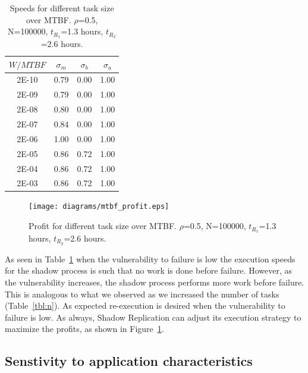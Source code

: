 \begin{table}[!h]\small
	\caption{Speeds for different task size over MTBF. $\rho$=0.5, N=100000, $t_{R_1}$=1.3 hours, $t_{R_2}$=2.6 hours.}
	\centering
		\begin{tabular}{|c|c|c|c|}
		\hline
		$W/MTBF$ & $\sigma_m$ & $\sigma_b$ & $\sigma_a$ \\
		\hline
		2E-10	&	0.79 &	0.00 &	1.00 \\
		\hline
		2E-09	&	0.79 &	0.00 &	1.00 \\
		\hline
		2E-08	&	0.80 &	0.00 &	1.00 \\
		\hline
		2E-07	&	0.84 &	0.00 &	1.00 \\
		\hline
		2E-06	&	1.00 &	0.00 &	1.00 \\
		\hline
		2E-05	&	0.86 &	0.72 &	1.00 \\
		\hline
		2E-04	&	0.86 &	0.72 &	1.00 \\
		\hline
		2E-03	&	0.86 &	0.72 &	1.00 \\
		\hline
		\end{tabular}
	\label{tbl:mtbf}
\end{table}

\begin{figure}[!h]	
	\begin{center}
			\texttt{[image: diagrams/mtbf\_profit.eps]}
	\end{center}
	\caption{Profit for different task size over MTBF. $\rho$=0.5, N=100000, $t_{R_1}$=1.3 hours, $t_{R_2}$=2.6 hours.}
	\label{fig:mtbf}
\end{figure}

As seen in Table~\ref{tbl:mtbf} when the vulnerability to
failure is low the execution speeds for the shadow process is such
that no work is done before failure. However, as the
vulnerability increases, the shadow process performs more work before
failure. This is analogous to what we observed as we increased the
number of tasks (Table~\ref{tbl:n}). As expected
re-execution is desired when the vulnerability to failure is
low. As always, Shadow Replication can adjust its execution strategy to maximize the profits, as shown in Figure~\ref{fig:mtbf}.

\subsection{Senstivity to application characteristics}


